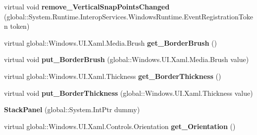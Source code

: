\begin{DoxyCompactItemize}
virtual void {\bfseries remove\+\_\+\+Vertical\+Snap\+Points\+Changed} (global\+::\+System.\+Runtime.\+Interop\+Services.\+Windows\+Runtime.\+Event\+Registration\+Token token)
\item 
\mbox{\label{class_windows_1_1_u_i_1_1_xaml_1_1_controls_1_1_stack_panel_ade57d63ba167e564115c51076407b86d}} 
virtual global\+::\+Windows.\+U\+I.\+Xaml.\+Media.\+Brush {\bfseries get\+\_\+\+Border\+Brush} ()
\item 
\mbox{\label{class_windows_1_1_u_i_1_1_xaml_1_1_controls_1_1_stack_panel_a9465b7d293751e261c9deb8f5bbc74f1}} 
virtual void {\bfseries put\+\_\+\+Border\+Brush} (global\+::\+Windows.\+U\+I.\+Xaml.\+Media.\+Brush value)
\item 
\mbox{\label{class_windows_1_1_u_i_1_1_xaml_1_1_controls_1_1_stack_panel_a9293dc30db12d0f3fb0b1465b4f79c8f}} 
virtual global\+::\+Windows.\+U\+I.\+Xaml.\+Thickness {\bfseries get\+\_\+\+Border\+Thickness} ()
\item 
\mbox{\label{class_windows_1_1_u_i_1_1_xaml_1_1_controls_1_1_stack_panel_a38a527c8e47cfb60586c9887434f6e3f}} 
virtual void {\bfseries put\+\_\+\+Border\+Thickness} (global\+::\+Windows.\+U\+I.\+Xaml.\+Thickness value)
\item 
\mbox{\label{class_windows_1_1_u_i_1_1_xaml_1_1_controls_1_1_stack_panel_ae651e05203c4e2a0ddc04022e050a4e7}} 
{\bfseries Stack\+Panel} (global\+::\+System.\+Int\+Ptr dummy)
\item 
\mbox{\label{class_windows_1_1_u_i_1_1_xaml_1_1_controls_1_1_stack_panel_a9834a2d1432003975ba8a69f4aa789c7}} 
virtual global\+::\+Windows.\+U\+I.\+Xaml.\+Controls.\+Orientation {\bfseries get\+\_\+\+Orientation} ()
\item 
\mbox{\label{class_windows_1_1_u_i_1_1_xaml_1_1_controls_1_1_stack_panel_a99d2c21e5e153b28fba470789fc1748a}} 

\end{DoxyCompactItemize}
